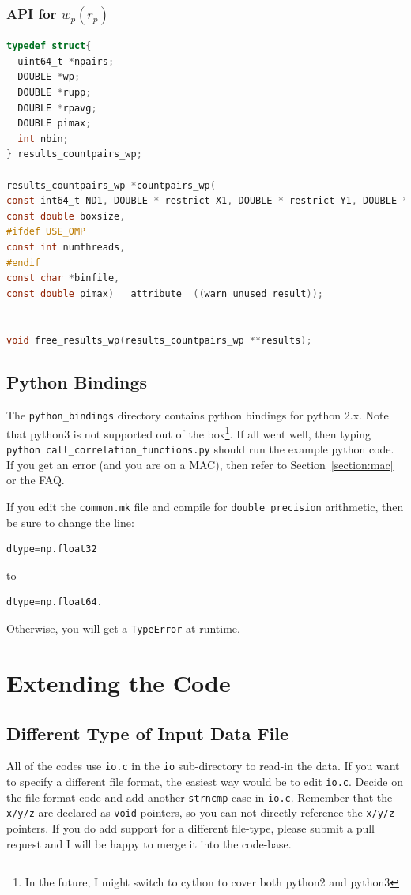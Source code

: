 \documentclass[12pt,titlepage]{article}
\let\stdsection\section
\renewcommand\section{\newpage\stdsection}
\newcommand{\wprp}{\ensuremath{{w_p(r_p)}}\xspace}
\begin{document}
\subsubsection{API for \texorpdfstring{\wprp}{wp(rp)}}
\begin{lstlisting}[language=C,numbers=none,label={code:API_wp},basicstyle=\scriptsize]
typedef struct{
  uint64_t *npairs;
  DOUBLE *wp;
  DOUBLE *rupp;
  DOUBLE *rpavg;
  DOUBLE pimax;
  int nbin;
} results_countpairs_wp;

results_countpairs_wp *countpairs_wp(
const int64_t ND1, DOUBLE * restrict X1, DOUBLE * restrict Y1, DOUBLE * restrict Z1,
const double boxsize, 
#ifdef USE_OMP
const int numthreads,
#endif
const char *binfile,
const double pimax) __attribute__((warn_unused_result));


void free_results_wp(results_countpairs_wp **results);
\end{lstlisting}


\subsection{Python Bindings}
The \texttt{python\_bindings} directory contains python bindings for python 2.x. Note that python3 is not supported out of the box\footnote{In the future, I might switch to 
cython to cover both python2 and python3}. If all went well, then typing \texttt{python call\_correlation\_functions.py} should run the example python code. If you get 
an error (and you are on a MAC), then refer to Section~\ref{section:mac} or the FAQ. 

If you edit the \texttt{common.mk} file and compile for \texttt{double precision} arithmetic, then be sure to change the line:
\begin{lstlisting}[language=python,numbers=none]
dtype=np.float32
\end{lstlisting}
to 
\begin{lstlisting}[language=python,numbers=none]
dtype=np.float64.
\end{lstlisting}
Otherwise, you will get a \texttt{TypeError} at runtime. 


\stdsection{Extending the Code}
\subsection{Different Type of Input Data File}
All of the codes use \texttt{io.c} in the \texttt{io} sub-directory to read-in the data. If you want to specify a different file format, the easiest way would be to edit 
\texttt{io.c}. Decide on the file format code and add another \texttt{strncmp} case in \texttt{io.c}. Remember that the \texttt{x/y/z} are declared as \texttt{void} pointers, 
so you can not directly reference the \texttt{x/y/z} pointers. If you do add support for a different file-type, please submit a pull request and I will be happy to merge it into the 
code-base. 
\end{document}
